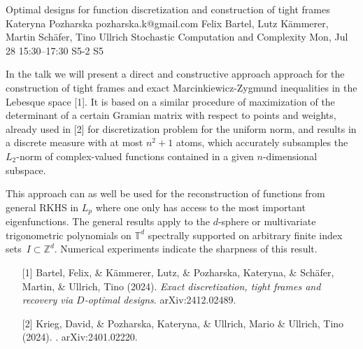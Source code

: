 \begin{talk}
  {Optimal designs for function discretization and construction of tight frames}%
  {Kateryna Pozharska}%
  {pozharska.k@gmail.com}%
  {Felix Bartel,  Lutz K\"ammerer,  Martin Sch\"afer, Tino Ullrich}%
  {Stochastic Computation and Complexity}%
  {}%
  {Mon, Jul 28 15:30–17:30}%
  {S5-2}%
  {S5}%
				



\medskip

In the talk we will present a direct and constructive approach approach for the construction of tight frames and exact Marcinkiewicz-Zygmund inequalities in the Lebesque space [1]. 
It is based on a similar procedure of maximization of the determinant of a certain Gramian matrix with respect to points and weights, already used in [2] for discretization problem for the uniform norm, and results in a discrete measure  with at most $n^2+1$ atoms, which accurately subsamples the $L_2$-norm of complex-valued functions contained in a  given $n$-dimensional subspace.

This approach can as well be used for the reconstruction of functions from general RKHS in $L_p$ where one only has access to the most important eigenfunctions. The general results apply to the $d$-sphere or multivariate trigonometric polynomials on $\mathbb{T}^d$ spectrally supported on arbitrary finite index sets~$I \subset \mathbb{Z}^d$.  Numerical experiments indicate the sharpness of this result. 


\begin{enumerate}
	\item[{[1]}]  Bartel, Felix,  \& Kämmerer, Lutz,  \& Pozharska,  Kateryna, \& Schäfer, Martin,  \& \newline Ullrich, Tino (2024). {\it Exact discretization, tight frames and recovery via $D$-optimal designs}. arXiv:2412.02489.
    
	\item[{[2]}] Krieg, David, \&  Pozharska, Kateryna, \& Ullrich, Mario \&  Ullrich, Tino (2024). . arXiv:2401.02220.

\end{enumerate}


\end{talk}

